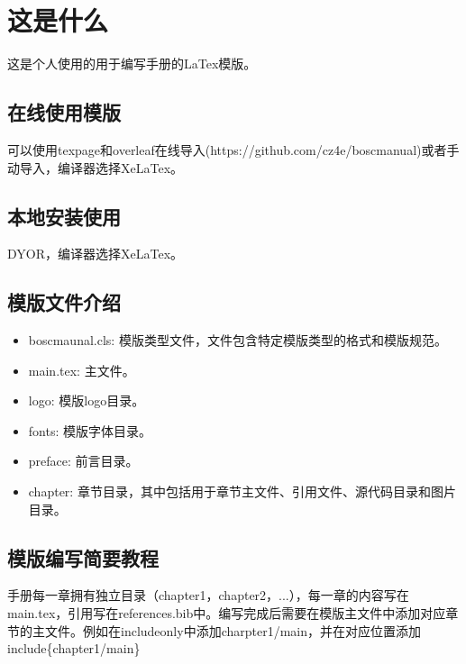\chapter{这是什么}
这是个人使用的用于编写手册的LaTex模版。

\section{在线使用模版}
可以使用texpage和overleaf在线导入(https://github.com/cz4e/boscmanual)或者手动导入，编译器选择XeLaTex。

\section{本地安装使用}
DYOR，编译器选择XeLaTex。

\section{模版文件介绍}
\begin{itemize}
    \item boscmaunal.cls: 模版类型文件，文件包含特定模版类型的格式和模版规范。
    \item main.tex: 主文件。
    \item logo: 模版logo目录。
    \item fonts: 模版字体目录。
    \item preface: 前言目录。
    \item chapter: 章节目录，其中包括用于章节主文件、引用文件、源代码目录和图片目录。
\end{itemize}

\section{模版编写简要教程}
手册每一章拥有独立目录（chapter1，chapter2，...），每一章的内容写在main.tex，引用写在references.bib中。编写完成后需要在模版主文件中添加对应章节的主文件。例如在includeonly中添加charpter1/main，并在对应位置添加include\{chapter1/main\}



